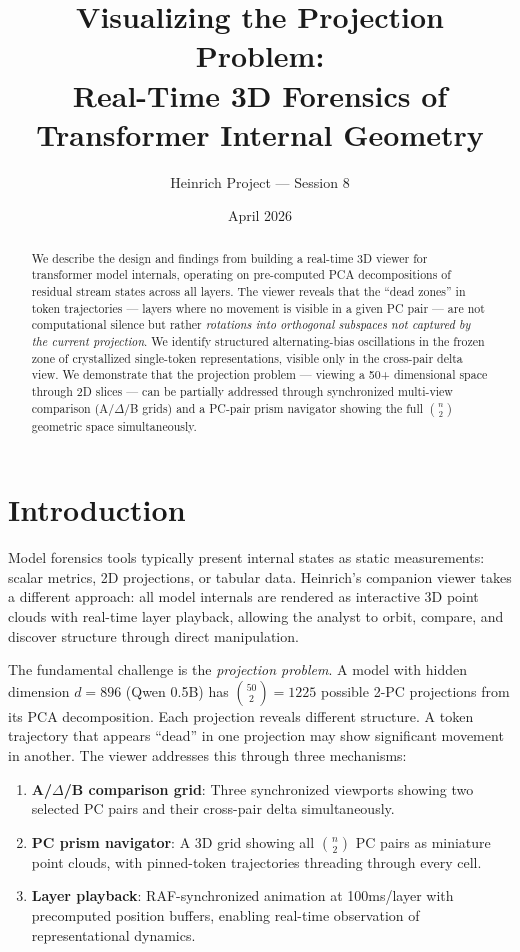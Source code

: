 \documentclass[11pt,a4paper]{article}
\title{Visualizing the Projection Problem: \\
Real-Time 3D Forensics of Transformer Internal Geometry}
\author{Heinrich Project — Session 8}
\date{April 2026}
\begin{document}
\maketitle

\begin{abstract}
We describe the design and findings from building a real-time 3D viewer for transformer model internals, operating on pre-computed PCA decompositions of residual stream states across all layers. The viewer reveals that the ``dead zones'' in token trajectories — layers where no movement is visible in a given PC pair — are not computational silence but rather \emph{rotations into orthogonal subspaces not captured by the current projection}. We identify structured alternating-bias oscillations in the frozen zone of crystallized single-token representations, visible only in the cross-pair delta view. We demonstrate that the projection problem — viewing a 50+ dimensional space through 2D slices — can be partially addressed through synchronized multi-view comparison (A/$\Delta$/B grids) and a PC-pair prism navigator showing the full $\binom{n}{2}$ geometric space simultaneously.
\end{abstract}

\section{Introduction}

Model forensics tools typically present internal states as static measurements: scalar metrics, 2D projections, or tabular data. Heinrich's companion viewer takes a different approach: all model internals are rendered as interactive 3D point clouds with real-time layer playback, allowing the analyst to orbit, compare, and discover structure through direct manipulation.

The fundamental challenge is the \emph{projection problem}. A model with hidden dimension $d=896$ (Qwen 0.5B) has $\binom{50}{2} = 1225$ possible 2-PC projections from its PCA decomposition. Each projection reveals different structure. A token trajectory that appears ``dead'' in one projection may show significant movement in another. The viewer addresses this through three mechanisms:

\begin{enumerate}
\item \textbf{A/$\Delta$/B comparison grid}: Three synchronized viewports showing two selected PC pairs and their cross-pair delta simultaneously.
\item \textbf{PC prism navigator}: A 3D grid showing all $\binom{n}{2}$ PC pairs as miniature point clouds, with pinned-token trajectories threading through every cell.
\item \textbf{Layer playback}: RAF-synchronized animation at 100ms/layer with precomputed position buffers, enabling real-time observation of representational dynamics.
\end{enumerate}
\end{document}
